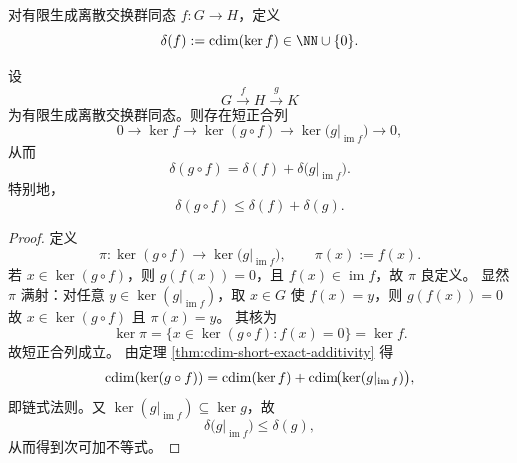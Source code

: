 \begin{definition}[圆维缺陷]\label{def:cdim-defect}
对有限生成离散交换群同态 \(f:G\to H\)，定义
\[
\delta(f):=\cdim(\ker f)\in\NN\cup\{0\}.
\]
\end{definition}

\begin{theorem}[圆维缺陷的链式法则]\label{thm:cdim-defect-chain-rule}
设
\[
G\xrightarrow{f}H\xrightarrow{g}K
\]
为有限生成离散交换群同态。则存在短正合列
\[
0\longrightarrow \ker f
\longrightarrow \ker(g\circ f)
\longrightarrow \ker\!\bigl(g|_{\operatorname{im}f}\bigr)
\longrightarrow 0,
\]
从而
\[
\delta(g\circ f)=\delta(f)+\delta\!\bigl(g|_{\operatorname{im}f}\bigr).
\]
特别地，
\[
\delta(g\circ f)\le \delta(f)+\delta(g).
\]
\end{theorem}
\begin{proof}
定义
\[
\pi:\ker(g\circ f)\to \ker\!\bigl(g|_{\operatorname{im}f}\bigr),\qquad
\pi(x):=f(x).
\]
若 \(x\in\ker(g\circ f)\)，则 \(g(f(x))=0\)，且 \(f(x)\in\operatorname{im}f\)，故 \(\pi\) 良定义。
显然 \(\pi\) 满射：对任意 \(y\in \ker(g|_{\operatorname{im}f})\)，取 \(x\in G\) 使 \(f(x)=y\)，则 \(g(f(x))=0\) 故 \(x\in\ker(g\circ f)\) 且 \(\pi(x)=y\)。
其核为
\[
\ker \pi=\{x\in\ker(g\circ f):f(x)=0\}=\ker f.
\]
故短正合列成立。
由定理 \ref{thm:cdim-short-exact-additivity} 得
\[
\operatorname{cdim}(\ker(g\circ f))
=\operatorname{cdim}(\ker f)+\operatorname{cdim}\!\bigl(\ker(g|_{\operatorname{im}f})\bigr),
\]
即链式法则。又 \(\ker(g|_{\operatorname{im}f})\subseteq \ker g\)，故
\[
\delta\!\bigl(g|_{\operatorname{im}f}\bigr)\le \delta(g),
\]
从而得到次可加不等式。
\end{proof}


